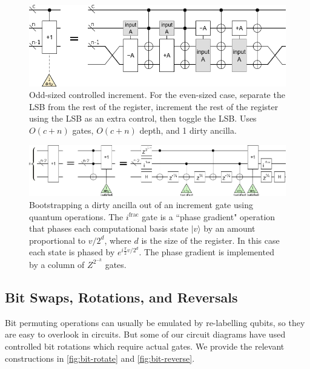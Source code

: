 \documentclass[twocolumn,longbibliography]{quantumarticle}
\begin{document}
\begin{figure}
  \centering
  \includegraphics[width=\linewidth]{assets/controlled-increment-odd.png}
  \caption{
    Odd-sized controlled increment.
    For the even-sized case, separate the LSB from the rest of the register, increment the rest of the register using the LSB as an extra control, then toggle the LSB.
    Uses $O(c+n)$ gates, $O(c+n)$ depth, and 1 dirty ancilla.
  }
  \label{fig:controlled-increment-odd}
\end{figure}

\begin{figure}
  \centering
  \includegraphics[width=\linewidth]{assets/ancilla-bootstrap.png}
  \caption{ Bootstrapping a dirty ancilla out of an increment gate using quantum operations.
  The $i^{\text{frac}}$ gate is a ``phase gradient" operation that phases each computational basis state $|v\rangle$ by an amount proportional to $v/2^d$, where $d$ is the size of the register.
  In this case each state is phased by $e^{i \frac{\pi}{2} v/2^d}$.
  The phase gradient is implemented by a column of $Z^{2^{-k}}$ gates.}
  \label{fig:bootstrap-ancilla}
\end{figure}


\subsection{Bit Swaps, Rotations, and Reversals}

Bit permuting operations can usually be emulated by re-labelling qubits, so they are easy to overlook in circuits.
But some of our circuit diagrams have used controlled bit rotations which require actual gates.
We provide the relevant constructions in \autoref{fig:bit-rotate} and \autoref{fig:bit-reverse}.
\end{document}
